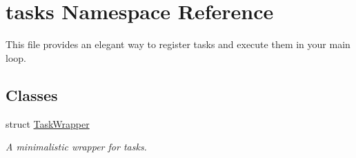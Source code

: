 \hypertarget{namespacetasks}{}\section{tasks Namespace Reference}
\label{namespacetasks}


This file provides an elegant way to register tasks and execute them in your main loop.  


\subsection*{Classes}
\begin{DoxyCompactItemize}
\item 
struct \hyperlink{structtasks_1_1TaskWrapper}{Task\+Wrapper}
\begin{DoxyCompactList}\small\item\em A minimalistic wrapper for tasks. \end{DoxyCompactList}\end{DoxyCompactItemize}
